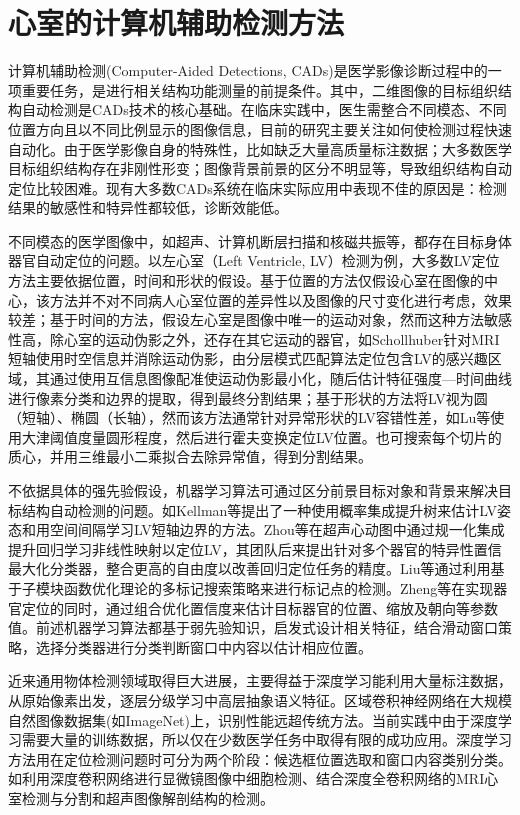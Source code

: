 \chapter{心室的计算机辅助检测方法}
\label{chap:Detection}


计算机辅助检测(Computer-Aided Detections, CADs)是医学影像诊断过程中的一项重要任务，是进行相关结构功能测量的前提条件。其中，二维图像的目标组织结构自动检测是CADs技术的核心基础。在临床实践中，医生需整合不同模态、不同位置方向且以不同比例显示的图像信息，目前的研究主要关注如何使检测过程快速自动化。由于医学影像自身的特殊性，比如缺乏大量高质量标注数据；大多数医学目标组织结构存在非刚性形变；图像背景前景的区分不明显等，导致组织结构自动定位比较困难。现有大多数CADs系统在临床实际应用中表现不佳的原因是：检测结果的敏感性和特异性都较低，诊断效能低\cite{Cheng2016a}。


不同模态的医学图像中，如超声、计算机断层扫描和核磁共振等，都存在目标身体器官自动定位的问题。以左心室（Left Ventricle, LV）检测为例，大多数LV定位方法主要依据位置，时间和形状的假设。基于位置的方法仅假设心室在图像的中心，该方法并不对不同病人心室位置的差异性以及图像的尺寸变化进行考虑，效果较差；基于时间的方法，假设左心室是图像中唯一的运动对象，然而这种方法敏感性高，除心室的运动伪影之外，还存在其它运动的器官，如Schollhuber\citep{Schollhuber2008}针对MRI短轴使用时空信息并消除运动伪影，由分层模式匹配算法定位包含LV的感兴趣区域，其通过使用互信息图像配准使运动伪影最小化，随后估计特征强度—时间曲线进行像素分类和边界的提取，得到最终分割结果；基于形状的方法将LV视为圆（短轴）、椭圆（长轴），然而该方法通常针对异常形状的LV容错性差，如Lu等\citep{Lu2009}使用大津阈值度量圆形程度，然后进行霍夫变换定位LV位置。也可搜索每个切片的质心，并用三维最小二乘拟合去除异常值，得到分割结果\citep{Petitjean2011}。


不依据具体的强先验假设，机器学习算法可通过区分前景目标对象和背景来解决目标结构自动检测的问题。如Kellman等\citep{Lu2011}提出了一种使用概率集成提升树来估计LV姿态和用空间间隔学习LV短轴边界的方法。Zhou等\citep{Zhou2005}在超声心动图中通过规一化集成提升回归学习非线性映射以定位LV，其团队后来提出针对多个器官的特异性置信最大化分类器，整合更高的自由度以改善回归定位任务的精度。Liu等\citep{She2007}通过利用基于子模块函数优化理论的多标记搜索策略来进行标记点的检测。Zheng等\citep{Zheng2014}在实现器官定位的同时，通过组合优化置信度来估计目标器官的位置、缩放及朝向等参数值。前述机器学习算法都基于弱先验知识，启发式设计相关特征，结合滑动窗口策略，选择分类器进行分类判断窗口中内容以估计相应位置。


近来通用物体检测领域取得巨大进展，主要得益于深度学习能利用大量标注数据，从原始像素出发，逐层分级学习中高层抽象语义特征\citep{Sharif2014}。区域卷积神经网络\citep{Girshick2014b}在大规模自然图像数据集(如ImageNet\citep{Russakovsky})上，识别性能远超传统方法\citep{Girshick2014b,Krizhevsky2012}。当前实践中由于深度学习需要大量的训练数据，所以仅在少数医学任务中取得有限的成功应用。深度学习方法用在定位检测问题时可分为两个阶段\citep{Girshick2015b}：候选框位置选取和窗口内容类别分类。如利用深度卷积网络进行显微镜图像中细胞检测\citep{Akram2016}、结合深度全卷积网络的MRI心室检测与分割\citep{Emad2015,Tran2016a}和超声图像解剖结构的检测\citep{Chen2016i}。

